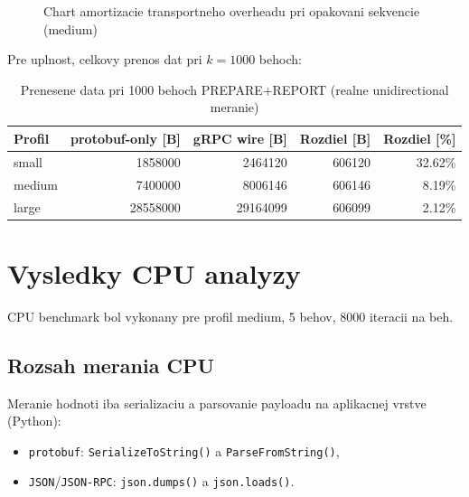 \documentclass[12pt,a4paper]{report}
\begin{document}
\begin{figure}[htbp]
\centering
{}
\caption{Chart amortizacie transportneho overheadu pri opakovani sekvencie (medium)}
\label{fig:grpc-overhead-runs-chart}
\end{figure}

Pre uplnost, celkovy prenos dat pri $k=1000$ behoch:
\begin{table}[htbp]
\centering
\caption{Prenesene data pri 1000 behoch PREPARE+REPORT (realne unidirectional meranie)}
\label{tab:transfer-1000-runs-all-profiles}
\begin{tabular}{|l|r|r|r|r|}
\hline
Profil & protobuf-only [B] & gRPC wire [B] & Rozdiel [B] & Rozdiel [\%] \\
\hline
small  & 1858000  & 2464120  & 606120 & 32.62\% \\
medium & 7400000  & 8006146  & 606146 & 8.19\% \\
large  & 28558000 & 29164099 & 606099 & 2.12\% \\
\hline
\end{tabular}
\end{table}

\section{Vysledky CPU analyzy}

CPU benchmark bol vykonany pre profil medium, 5 behov, 8000 iteracii na beh.

\subsection{Rozsah merania CPU}

Meranie hodnoti iba serializaciu a parsovanie payloadu
na aplikacnej vrstve (Python):
\begin{itemize}
  \item \texttt{protobuf}: \texttt{SerializeToString()} a \texttt{ParseFromString()},
  \item \texttt{JSON}/\texttt{JSON-RPC}: \texttt{json.dumps()} a \texttt{json.loads()}.
\end{itemize}
\end{document}
